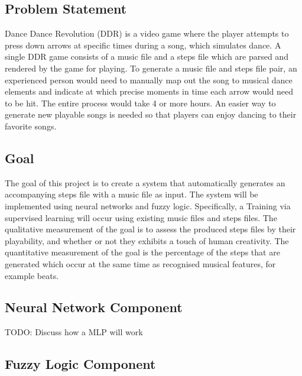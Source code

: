 \subsection{Problem Statement}
Dance Dance Revolution (DDR) is a video game where the player attempts to press down arrows at specific times during a song, which simulates dance. A single DDR game consists of a music file and a steps file which are parsed and rendered by the game for playing. To generate a music file and steps file pair, an experienced person would need to manually map out the song to musical dance elements and indicate at which precise moments in time each arrow would need to be hit. The entire process would take 4 or more hours. An easier way to generate new playable songs is needed so that players can enjoy dancing to their favorite songs.\\

\subsection{Goal}
The goal of this project is to create a system that automatically generates an accompanying steps file with a music file as input. The system will be implemented using neural networks and fuzzy logic. Specifically, a  Training via supervised learning will occur using existing music files and steps files. The qualitative measurement of the goal is to assess the produced steps files by their playability, and whether or not they exhibits a touch of human creativity. The quantitative measurement of the goal is the percentage of the steps that are generated which occur at the same time as recognised musical features, for example beats.\\

\subsection{Neural Network Component}

TODO: Discuss how a MLP will work

\subsection{Fuzzy Logic Component}


